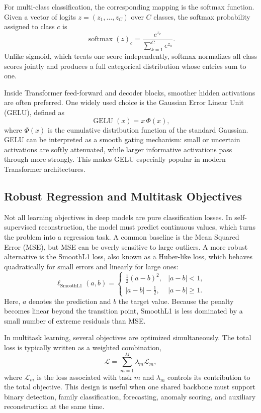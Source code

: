 \documentclass[12pt, a4paper]{report}
\begin{document}
For multi-class classification, the corresponding mapping is the softmax function. Given a vector of logits $z = (z_1,\dots,z_C)$ over $C$ classes, the softmax probability assigned to class $c$ is
\begin{equation}
\operatorname{softmax}(z)_c = \frac{e^{z_c}}{\sum_{k=1}^{C} e^{z_k}}.
\end{equation}
Unlike sigmoid, which treats one score independently, softmax normalizes all class scores jointly and produces a full categorical distribution whose entries sum to one.

Inside Transformer feed-forward and decoder blocks, smoother hidden activations are often preferred. One widely used choice is the Gaussian Error Linear Unit (GELU), defined as
\begin{equation}
\operatorname{GELU}(x)=x\,\Phi(x),
\end{equation}
where $\Phi(x)$ is the cumulative distribution function of the standard Gaussian. GELU can be interpreted as a smooth gating mechanism: small or uncertain activations are softly attenuated, while larger informative activations pass through more strongly. This makes GELU especially popular in modern Transformer architectures.

\subsection{Robust Regression and Multitask Objectives}
Not all learning objectives in deep models are pure classification losses. In self-supervised reconstruction, the model must predict continuous values, which turns the problem into a regression task. A common baseline is the Mean Squared Error (MSE), but MSE can be overly sensitive to large outliers. A more robust alternative is the SmoothL1 loss, also known as a Huber-like loss, which behaves quadratically for small errors and linearly for large ones:
\begin{equation}
\ell_{\mathrm{SmoothL1}}(a,b)=
\begin{cases}
\frac{1}{2}(a-b)^2, & |a-b|<1, \\
|a-b|-\frac{1}{2}, & |a-b|\ge 1.
\end{cases}
\end{equation}
Here, $a$ denotes the prediction and $b$ the target value. Because the penalty becomes linear beyond the transition point, SmoothL1 is less dominated by a small number of extreme residuals than MSE.

In multitask learning, several objectives are optimized simultaneously. The total loss is typically written as a weighted combination,
\begin{equation}
\mathcal{L}=\sum_{m=1}^{M} \lambda_m\mathcal{L}_m,
\end{equation}
where $\mathcal{L}_m$ is the loss associated with task $m$ and $\lambda_m$ controls its contribution to the total objective. This design is useful when one shared backbone must support binary detection, family classification, forecasting, anomaly scoring, and auxiliary reconstruction at the same time.
\end{document}
